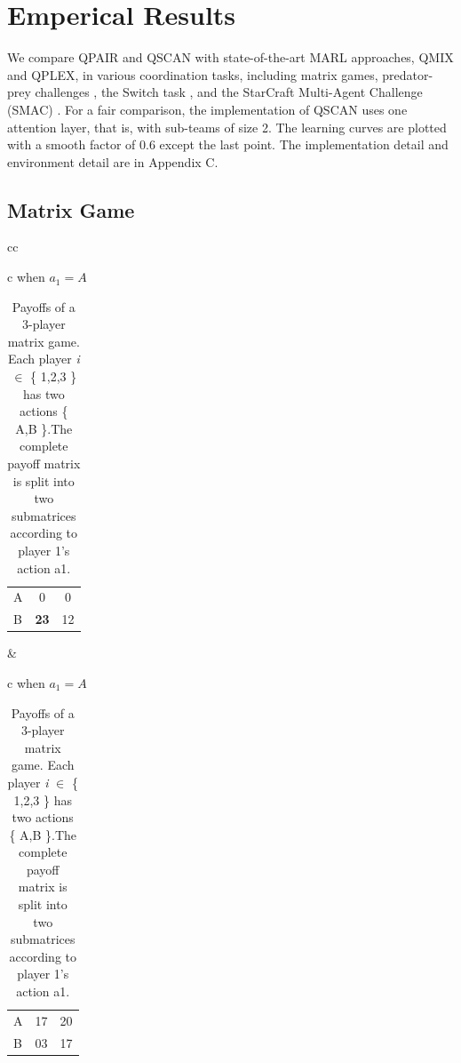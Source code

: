
\section{\textbf{Emperical Results}}
    We compare QPAIR and QSCAN with state-of-the-art MARL approaches, QMIX and QPLEX, in various coordination tasks, including matrix games, predator-prey challenges \cite{r8}, the Switch task \cite{r6}, and the StarCraft Multi-Agent Challenge (SMAC) \cite{r7}. For a fair comparison, the implementation of QSCAN uses one attention layer, that is, with sub-teams of size 2. The learning curves are plotted with a smooth factor of 0.6 except the last point. The implementation detail and environment detail are in Appendix C. 


    \subsection{Matrix Game}
    \begin{table}
        \caption{Payoffs of a 3-player matrix game. Each player \emph{i} $\in$ \{ 1,2,3 \} has two actions \{ A,B \}.The complete payoff matrix is split into two submatrices according to player 1’s action a1.}
        \vspace{10pt}
        \begin{tabular}{cc}
             \begin{tabular}{c}
                 when $a_1=A$ \\[2ex]
                \begin{tabular}{|l||*{2}{c|}}\hline
                    \backslashbox{$a_{2}$}{$a_{3}$}
                    &\makebox[3em]{A}&\makebox[3em]{B}\\\hline\hline
                     A &0 &0\\\hline
                     B &\textbf{23}&12\\\hline
                \end{tabular}
             \end{tabular}
             &
             \begin{tabular}{c}
                 when $a_1=A$ \\[2ex]
                \begin{tabular}{|l||*{2}{c|}}\hline
                    \backslashbox{$a_{2}$}{$a_{3}$}
                    &\makebox[3em]{A}&\makebox[3em]{B}\\\hline\hline
                     A &17 &20\\\hline
                     B &03&17\\\hline
                \end{tabular}
             \end{tabular}
        \end{tabular}
        \label{tab:pay}
    \end{table}

